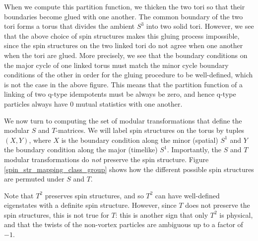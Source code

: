 \documentclass[12pt,a4paper]{article}
\begin{document}
When we compute this partition function, we thicken the two tori so that their boundaries become glued with one another. The common boundary of the two tori forms a torus that divides the ambient $S^3$ into two solid tori. However, we see that the above choice of spin structures makes this gluing process impossible, since the spin structures on the two linked tori do not agree when one another when the tori are glued. More precisely, we see that the boundary conditions on the major cycle of one linked torus must match the minor cycle boundary conditions of the other in order for the gluing procedure to be well-defined, which is not the case in the above figure. This means that the partition function of a linking of two q-type idempotents must be always be zero, and hence q-type particles always have 0 mutual statistics with one another. 



We now turn to computing the set of modular transformations that define the modular $S$ and $T$-matrices. We will label spin structures on the torus by tuples $(X,Y)$, where $X$ is the boundary condition along the minor (spatial) $S^1$ and $Y$ the boundary condition along the major (timelike) $S^1$. Importantly, the $S$ and $T$ modular transformations do {\it not} preserve the spin structure. Figure \ref{spin_str_mapping_class_group} shows how the different possible spin structures are permuted under $S$ and $T$. 

Note that $T^2$ preserves spin structures, and so $T^2$ can have well-defined eigenstates with a definite spin structure. However, since $T$ does not preserve the spin structures, this is not true for $T$: this is another sign that only $T^2$ is physical, and that the twists of the non-vortex particles are ambiguous up to a factor of $-1$. 
\end{document}
